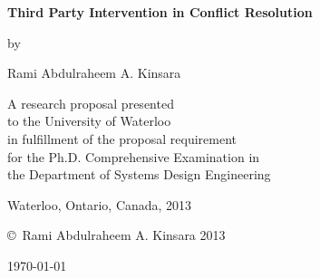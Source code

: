 \documentclass[letterpaper,12pt,titlepage,oneside,final]{book}
\begin{document}
\begin{titlepage}
        \begin{center}
        \vspace*{0.5cm}

        \Huge
        {\bf Third Party Intervention in Conflict Resolution}

        \vspace*{0.5cm}

        \normalsize
        by \\

        \vspace*{0.5cm}

        \Large
        Rami Abdulraheem A. Kinsara \\
        \vspace*{0.5cm}

        \normalsize
        A research proposal presented \\to the University of Waterloo \\ in fulfillment of the proposal requirement \\ for the Ph.D. Comprehensive Examination in \\ the Department of Systems Design Engineering \\

        \vspace*{0.5cm}

        Waterloo, Ontario, Canada, 2013 \\

        \vspace*{0.5cm}

        \copyright\ Rami Abdulraheem A. Kinsara 2013 \\
        
        \vspace{0.5cm}
        
	\today    
	     
        \end{center}
\end{titlepage}
\end{document}
